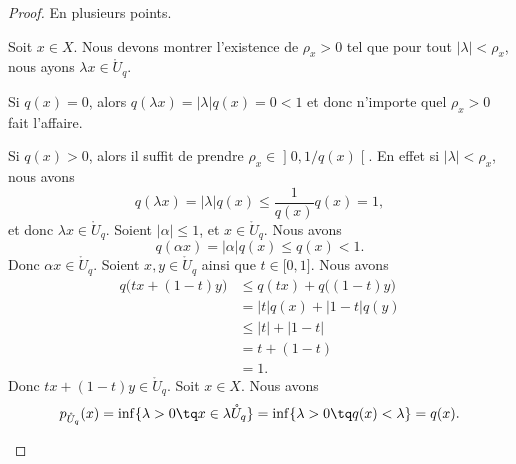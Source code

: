 \begin{proof}
	En plusieurs points.
	\begin{subproof}
		Soit \( x\in X\). Nous devons montrer l'existence de \( \rho_x>0\) tel que pour tout \( | \lambda |<\rho_x\), nous ayons \( \lambda x\in \mathring{U}_q\).

		Si \( q(x)=0\), alors \( q(\lambda x)=| \lambda |q(x)=0<1\) et donc n'importe quel \( \rho_x>0\) fait l'affaire.

		Si \( q(x)>0\), alors il suffit de prendre \( \rho_x\in \mathopen] 0,1/q(x)\mathclose[\). En effet si \( | \lambda |<\rho_x\), nous avons
		\begin{equation}
			q(\lambda x)=| \lambda |q(x)\leq \frac{1}{ q(x)}q(x)=1,
		\end{equation}
		et donc \( \lambda x\in \mathring{U}_q\).
		Soient \( | \alpha |\leq 1\), et \( x\in \mathring{U}_q\). Nous avons
		\begin{equation}
			q(\alpha x)=| \alpha |q(x)\leq q(x)<1.
		\end{equation}
		Donc \( \alpha x\in \mathring{U}_q\).
		Soient \( x,y\in \mathring{U}_q\) ainsi que \( t\in\mathopen[ 0,1\mathclose]\). Nous avons
		\begin{subequations}
			\begin{align}
				q\big( tx+(1-t)y \big) & \leq q(tx)+q\big( (1-t)y \big) \\
				                       & =| t |q(x)+| 1-t |q(y)         \\
				                       & \leq | t |+| 1-t |             \\
				                       & =t+(1-t)                       \\
				                       & =1.
			\end{align}
		\end{subequations}
		Donc \( tx+(1-t)y\in \mathring{U}_q\).
		\spitem[\( q=p_{\mathring{U}_q}\)]
		Soit \( x\in X\). Nous avons
		\begin{equation}
			p_{\mathring{U}_q}(x)=\inf\{ \lambda>0\tq x\in \lambda \mathring{U}_q \}=\inf\{ \lambda >0\tq q(x)<\lambda \}=q(x).
		\end{equation}
	\end{subproof}
\end{proof}


